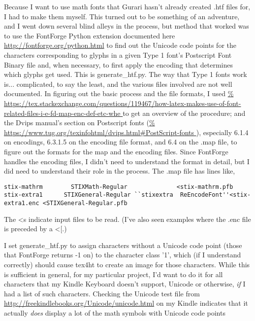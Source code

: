\documentclass[12pt]{article}
\begin{document}
Because I want to use math fonts that Gurari hasn't already created
.htf files for, I had to make them myself.  This turned out to be
something of an adventure, and I went down several blind alleys in the
process, but method that worked was to use the FontForge Python
extension documented here \url{http://fontforge.org/python.html} to
find out the Unicode code points for the characters corresponding to
glyphs in a given Type 1 font's Postscript Font Binary file and, when
necessary, to first apply the encoding that determines which glyphs
get used.  This is generate\_htf.py.  The way that Type 1 fonts work
is... complicated, to say the least, and the various files involved
are not well documented.  In figuring out the basic process and the
file formats, I used
\url{%
https://tex.stackexchange.com/questions/119467/how-latex-makes-use-of-font-related-files-i-e-fd-map-enc-def-etc-whe
}
to get an overview of the procedure; and the Dvips manual's section on
Postscript fonts
(\url{%
https://www.tug.org/texinfohtml/dvips.html#PostScript-fonts
}),
especially 6.1.4 on encodings, 6.3.1.5 on the encoding file format,
and 6.4 on the .map file, to figure out the formats for the map and
the encoding files.  Since FontForge handles the encoding files, I
didn't need to understand the format in detail, but I did need to
understand their role in the process.  The .map file has lines like,

\begin{lstlisting}
stix-mathrm        STIXMath-Regular              <stix-mathrm.pfb
stix-extra1      STIXGeneral-Regular ``stixextra  ReEncodeFont''<stix-extra1.enc <STIXGeneral-Regular.pfb
\end{lstlisting}

The <s indicate input files to be read.  (I've also seen examples where the
.enc file is preceded by a <[.)

I set generate\_htf.py to assign characters without a Unicode code
point (those that FontForge returns -1 on) to the character class '1',
which (if I understand correctly) should cause tex4ht to create an
image for those characters.  While this is sufficient in general, for
my particular project, I'd want to do it for all characters that my
Kindle Keyboard doesn't support, Unicode or otherwise, \emph{if} I had
a list of such characters.  Checking the Unicode test file from
\url{http://freekindlebooks.org/Unicode/unicode.html} on my Kindle
indicates that it actually \emph{does} display a lot of the math
symbols with Unicode code points

\end{document}
